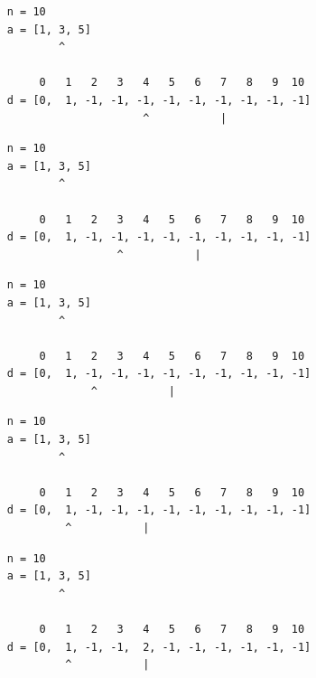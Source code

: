\begin{frame}[fragile]
\begin{verbatim}
     n = 10
     a = [1, 3, 5]
             ^

          0   1   2   3   4   5   6   7   8   9  10
     d = [0,  1, -1, -1, -1, -1, -1, -1, -1, -1, -1]
                          ^           |
\end{verbatim}
\end{frame}
\addtocounter{framenumber}{-1}

\begin{frame}[fragile]
\begin{verbatim}
     n = 10
     a = [1, 3, 5]
             ^

          0   1   2   3   4   5   6   7   8   9  10
     d = [0,  1, -1, -1, -1, -1, -1, -1, -1, -1, -1]
                      ^           |
\end{verbatim}
\end{frame}
\addtocounter{framenumber}{-1}

\begin{frame}[fragile]
\begin{verbatim}
     n = 10
     a = [1, 3, 5]
             ^

          0   1   2   3   4   5   6   7   8   9  10
     d = [0,  1, -1, -1, -1, -1, -1, -1, -1, -1, -1]
                  ^           |
\end{verbatim}
\end{frame}
\addtocounter{framenumber}{-1}

\begin{frame}[fragile]
\begin{verbatim}
     n = 10
     a = [1, 3, 5]
             ^

          0   1   2   3   4   5   6   7   8   9  10
     d = [0,  1, -1, -1, -1, -1, -1, -1, -1, -1, -1]
              ^           |
\end{verbatim}
\end{frame}
\addtocounter{framenumber}{-1}

\begin{frame}[fragile]
\begin{verbatim}
     n = 10
     a = [1, 3, 5]
             ^

          0   1   2   3   4   5   6   7   8   9  10
     d = [0,  1, -1, -1,  2, -1, -1, -1, -1, -1, -1]
              ^           |
\end{verbatim}
\end{frame}
\addtocounter{framenumber}{-1}

